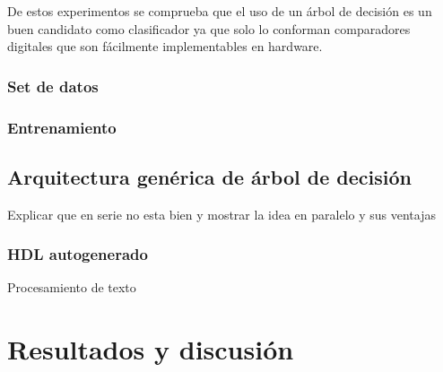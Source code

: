 \documentclass[twoside,spanish,ESP,MSc]{plantillaLabUPV}
\theoremstyle{definition}
\begin{document}
\begin{enumerate}
\begin{enumerate}
\end{enumerate}

De estos experimentos se comprueba que el uso de un árbol de decisión es un buen candidato como clasificador ya que solo lo conforman comparadores digitales que son fácilmente implementables en hardware.\\

\subsection{Set de datos}
\subsection{Entrenamiento}


\section{Arquitectura genérica de árbol de decisión}

Explicar que en serie no esta bien y mostrar la idea en paralelo y sus ventajas

\subsection{HDL autogenerado}

Procesamiento de texto











\end{enumerate}






\chapter{Resultados y discusión}

\end{document}
